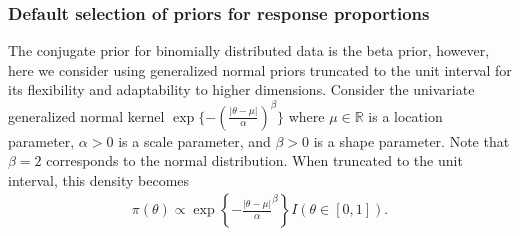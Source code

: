\documentclass[12pt]{article}
\begin{document}

%

\subsubsection{Default selection of priors for response proportions}
The conjugate prior for binomially distributed data is the beta prior, however, here we consider using generalized normal priors truncated to the unit interval for its flexibility and adaptability to higher dimensions.
Consider the univariate generalized normal kernel $\exp\{-(\frac{|\theta-\mu|}{\alpha})^\beta\}$ where $\mu\in\mathbb{R}$ is a location parameter, $\alpha>0$ is a scale parameter, and $\beta>0$ is a shape parameter. Note that $\beta=2$ corresponds to the normal distribution. When truncated to the unit interval, this density becomes
\begin{align}\label{eq:generalized_normal_univariate}
\pi(\theta)\propto \exp\left\{-\frac{|\theta-\mu|}{\alpha}^\beta\right\} I(\theta\in[0,1]).
\end{align}
\end{document}
